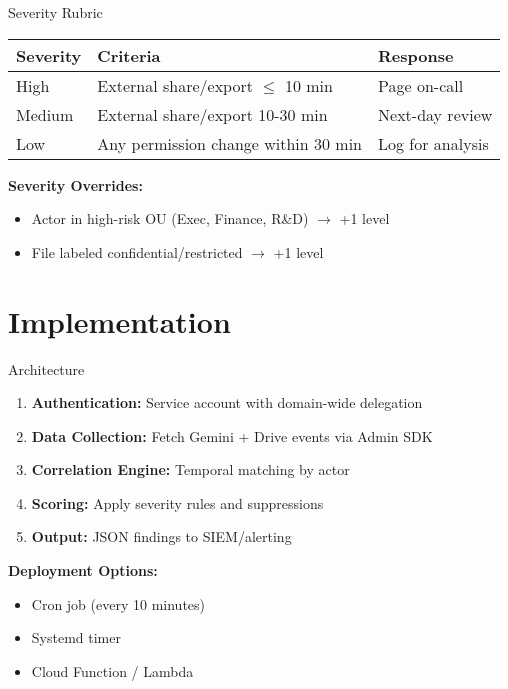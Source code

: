 \documentclass[aspectratio=169]{beamer}
\begin{document}
\begin{frame}{Severity Rubric}
\begin{table}
\centering
\small
\begin{tabular}{|l|l|l|}
\hline
\textbf{Severity} & \textbf{Criteria} & \textbf{Response} \\ \hline
High & External share/export $\leq$ 10 min & Page on-call \\ \hline
Medium & External share/export 10-30 min & Next-day review \\ \hline
Low & Any permission change within 30 min & Log for analysis \\ \hline
\end{tabular}
\end{table}

\vspace{1em}

\textbf{Severity Overrides:}
\begin{itemize}
    \item Actor in high-risk OU (Exec, Finance, R\&D) $\rightarrow$ +1 level
    \item File labeled confidential/restricted $\rightarrow$ +1 level
\end{itemize}
\end{frame}

\section{Implementation}

\begin{frame}{Architecture}
\begin{enumerate}
    \item \textbf{Authentication:} Service account with domain-wide delegation
    \item \textbf{Data Collection:} Fetch Gemini + Drive events via Admin SDK
    \item \textbf{Correlation Engine:} Temporal matching by actor
    \item \textbf{Scoring:} Apply severity rules and suppressions
    \item \textbf{Output:} JSON findings to SIEM/alerting
\end{enumerate}

\vspace{1em}

\textbf{Deployment Options:}
\begin{itemize}
    \item Cron job (every 10 minutes)
    \item Systemd timer
    \item Cloud Function / Lambda
\end{itemize}
\end{frame}
\end{document}
